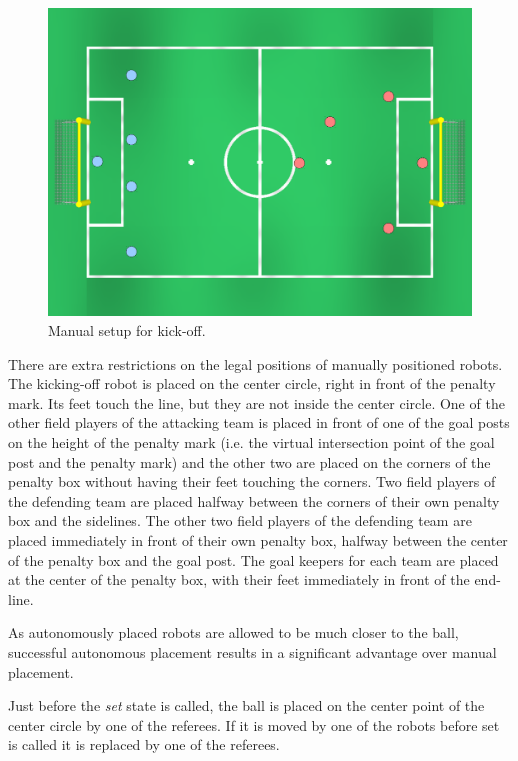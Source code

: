 \documentclass[12pt]{article}
\begin{document}
\begin{figure}[t]
\centerline{\includegraphics[width=\columnwidth]{figs/manual_placement_2013.pdf}}
\caption{Manual setup for kick-off.}
\label{fig:ko}
\end{figure}

There are extra restrictions on the legal positions of manually positioned robots. The kicking-off robot is placed on the center circle, right in front of the penalty mark. Its feet touch the line, but they are not inside the center circle. 
One of the other field players of the attacking team is placed in front of one of the goal posts on the height of the penalty mark (i.e. the virtual intersection point of the goal post and the penalty mark) and the other two are placed on the corners of the penalty box without having their feet touching the corners. 
Two field players of the defending team are placed halfway between the corners of their own penalty box and the sidelines. The other two field players of the defending team are placed immediately in front of their own penalty box, halfway between the center of the penalty box and the goal post.  The goal keepers for each team are placed at the center of the penalty box, with their feet immediately in front of the end-line.

As autonomously placed robots are allowed to be much closer to the ball, successful autonomous placement results in a significant advantage over manual placement.

Just before the \emph{set} state is called, the ball is placed on the center point of the center circle by one of the referees. If it is moved by one of the robots before set is called it is replaced by one of the referees.
\end{document}
